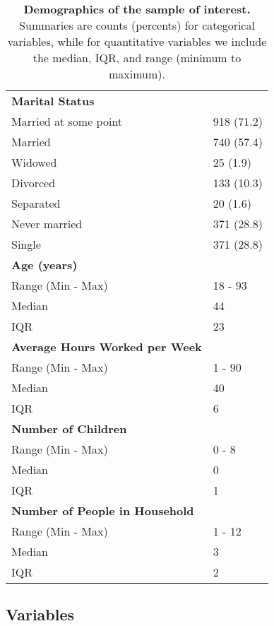 \documentclass{article}
\newcommand*\pct{\scalebox{.85}{\%}}
\begin{document}
\begin{table}
\begin{tabu}{X[l]X[r]}
    \textbf{Marital Status} & \\
    \qquad Married at some point & 918 (71.2\pct) \\
    \qquad \qquad Married & 740 (57.4\pct) \\
    \qquad \qquad Widowed & 25 (1.9\pct) \\
    \qquad \qquad Divorced & 133 (10.3\pct) \\
    \qquad \qquad Separated & 20 (1.6\pct) \\
    \qquad Never married & 371 (28.8\pct) \\
    \qquad \qquad Single & 371 (28.8\pct) \\
    
    \textbf{Age (years)} & \\
    \qquad Range (Min - Max) & 18 - 93 \\
    \qquad Median & 44 \\
    \qquad IQR & 23 \\
    
    \textbf{Average Hours Worked per Week} & \\
    \qquad Range (Min - Max) & 1 - 90 \\
    \qquad Median & 40 \\
    \qquad IQR & 6 \\
    
    \textbf{Number of Children} & \\
    \qquad Range (Min - Max) & 0 - 8 \\
    \qquad Median & 0 \\
    \qquad IQR & 1 \\
    
    \textbf{Number of People in Household} & \\
    \qquad Range (Min - Max) & 1 - 12 \\
    \qquad Median & 3 \\
    \qquad IQR & 2 \\
    
    \bottomrule
\end{tabu}
\caption{\textbf{Demographics of the sample of interest.} Summaries are counts (percents) for categorical variables, while for quantitative variables we include the median, IQR, and range (minimum to maximum).}
\label{demographics}
\end{table}

\subsection{Variables}
\end{document}
